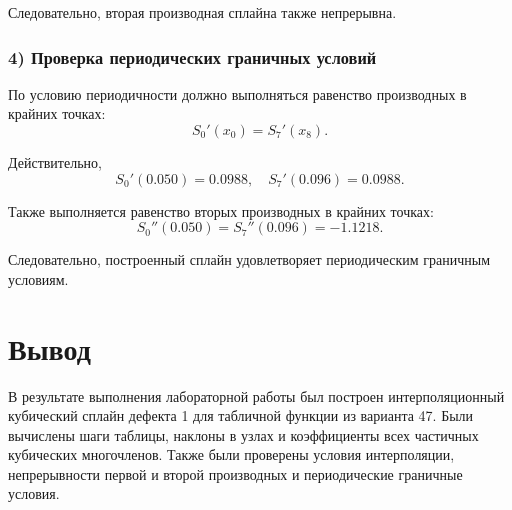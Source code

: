 Следовательно, вторая производная сплайна также непрерывна.

\subsubsection*{4) Проверка периодических граничных условий}

По условию периодичности должно выполняться равенство производных в крайних точках:
\[
S_0'(x_0)=S_7'(x_8).
\]

Действительно,
\[
S_0'(0.050)=0.0988, \quad S_7'(0.096)=0.0988.
\]

Также выполняется равенство вторых производных в крайних точках:
\[
S_0''(0.050)=S_7''(0.096)=-1.1218.
\]

Следовательно, построенный сплайн удовлетворяет периодическим граничным условиям.

\section{Вывод}

В результате выполнения лабораторной работы был построен интерполяционный кубический сплайн дефекта 1 для табличной функции из варианта 47. Были вычислены шаги таблицы, наклоны в узлах и коэффициенты всех частичных кубических многочленов. Также были проверены условия интерполяции, непрерывности первой и второй производных и периодические граничные условия.
